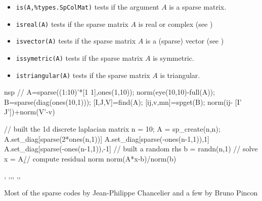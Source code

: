 \begin{itemize}
    \item \verb+is(A,%types.SpColMat)+ tests if the argument $A$ is a sparse matrix.
    \item \verb+isreal(A)+ tests if the sparse matrix $A$ is real or complex (see )
    \item \verb+isvector(A)+ tests if the sparse matrix $A$ is a (sparse) vector (see )
    \item \verb+issymetric(A)+ tests if the sparse matrix $A$ is symmetric.
    \item \verb+istriangular(A)+ tests if the sparse matrix $A$ is triangular.
\end{itemize}


\begin{examples}
\begin{mintednsp}{nsp}
//
A=sparse((1:10)'*[1 1],ones(1,10));
norm(eye(10,10)-full(A));
B=sparse(diag(ones(10,1)));
[I,J,V]=find(A);
[ij,v,mn]=spget(B);
norm(ij- [I' J'])+norm(V'-v)

// built the 1d discrete laplacian matrix
n = 10;
A = sp_create(n,n);
A.set_diag[sparse(2*ones(n,1))]
A.set_diag[sparse(-ones(n-1,1)),1]
A.set_diag[sparse(-ones(n-1,1)),-1]
// built a random rhs
b = randn(n,1)
// solve
x = A\b
// compute residual norm
norm(A*x-b)/norm(b)
\end{mintednsp}
\end{examples}

\begin{manseealso}
,
,,,
,,
\end{manseealso}

\begin{authors}
   Most of the sparse codes by Jean-Philippe Chancelier and a few by Bruno Pincon
\end{authors}
